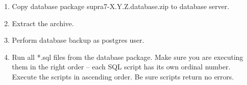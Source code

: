 \documentclass[12pt]{article}
\newcommand{\vigPackageName}{supra7}
\begin{document}
\begin{enumerate}
	\item Copy database package {\vigPackageName}-X.Y.Z.database.zip to database server.
	\item Extract the archive.
	\item Perform database backup as postgres user.
	\item Run all *.sql files from the database package. Make sure you are executing them in the right order -- each SQL script has its own ordinal number. Execute the scripts in ascending order. Be sure scripts return no errors.
\end{enumerate}
\end{document}
